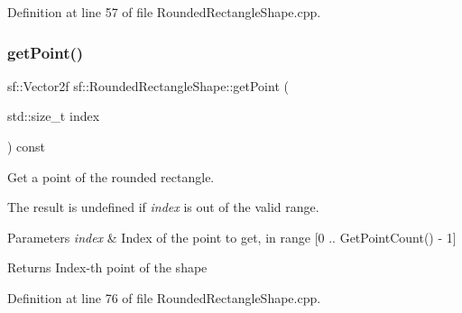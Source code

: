 Definition at line 57 of file Rounded\+Rectangle\+Shape.\+cpp.


\begin{DoxyCode}{0}

\end{DoxyCode}
\mbox{\label{classsf_1_1_rounded_rectangle_shape_a886ad233fd59331e3b792afeb787d764}} 
\subsubsection{\texorpdfstring{getPoint()}{getPoint()}}
{\footnotesize\ttfamily sf\+::\+Vector2f sf\+::\+Rounded\+Rectangle\+Shape\+::get\+Point (\begin{DoxyParamCaption}\item[{std\+::size\+\_\+t}]{index }\end{DoxyParamCaption}) const\hspace{0.3cm}{\ttfamily [virtual]}}



Get a point of the rounded rectangle. 

The result is undefined if {\itshape index} is out of the valid range.


\begin{DoxyParams}{Parameters}
{\em index} & Index of the point to get, in range \mbox{[}0 .. Get\+Point\+Count() -\/ 1\mbox{]}\\
\hline
\end{DoxyParams}
\begin{DoxyReturn}{Returns}
Index-\/th point of the shape \begin{DoxyVerb}\end{DoxyVerb}
 
\end{DoxyReturn}


Definition at line 76 of file Rounded\+Rectangle\+Shape.\+cpp.


